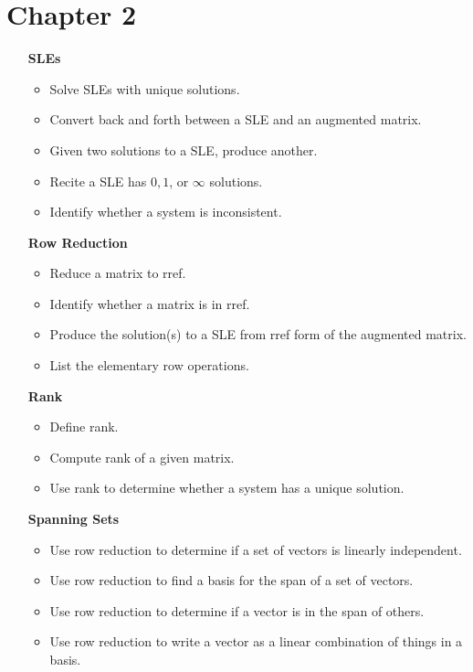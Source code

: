 \documentclass[letter]{article}
\begin{document}
	\section*{Chapter 2}
	\begin{enumerate}
		\item[\bf SLEs] 
			\begin{itemize}
				\item Solve SLEs with unique solutions.
				\item Convert back and forth between a SLE and an augmented matrix.
				\item Given two solutions to a SLE, produce another.
				\item Recite a SLE has $0,1$, or $\infty$ solutions.
				\item Identify whether a system is inconsistent.
			\end{itemize}
		\item[\bf Row Reduction] 
			\begin{itemize}
				\item Reduce a matrix to rref.
				\item Identify whether a matrix is in rref.
				\item Produce the solution(s) to a SLE from rref form of the augmented matrix.
				\item List the elementary row operations.
			\end{itemize}
		\item[\bf Rank] 
			\begin{itemize}
				\item Define rank.
				\item Compute rank of a given matrix.
				\item Use rank to determine whether a system has a unique solution.
			\end{itemize}
		\item[\bf Spanning Sets] 
			\begin{itemize}
				\item Use row reduction to determine if a set of vectors is linearly independent.
				\item Use row reduction to find a basis for the span of a set of vectors.
				\item Use row reduction to determine if a vector is in the span of others.
				\item Use row reduction to write a vector as a linear combination of things in a basis.
			\end{itemize}
	\end{enumerate}
	
\end{document}
